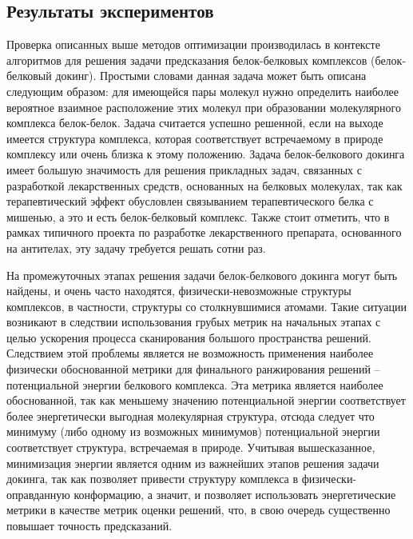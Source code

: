 \subsection{Результаты экспериментов}

  Проверка описанных выше методов оптимизации производилась в контексте алгоритмов для решения задачи предсказания белок-белковых комплексов (белок-белковый докинг). Простыми словами данная задача может быть описана следующим образом: для имеющейся пары молекул нужно определить наиболее вероятное взаимное расположение этих молекул при образовании молекулярного комплекса белок-белок. Задача считается успешно решенной, если на выходе имеется структура комплекса, которая соответствует встречаемому в природе комплексу или очень близка к этому положению. Задача белок-белкового докинга имеет большую значимость для решения прикладных задач, связанных с разработкой лекарственных средств, основанных на белковых молекулах, так как терапевтический эффект обусловлен связыванием терапевтического белка с мишенью, а это и есть белок-белковый комплекс. Также стоит отметить, что в рамках типичного проекта по разработке лекарственного препарата, основанного на антителах,
  эту задачу требуется решать сотни раз.

  На промежуточных этапах решения задачи белок-белкового докинга могут быть найдены, и очень часто находятся, физически-невозможные структуры комплексов, в частности, структуры со столкнувшимися атомами. Такие ситуации возникают в следствии использования грубых метрик на начальных этапах с целью ускорения процесса сканирования большого пространства решений. Следствием этой проблемы является не возможность применения наиболее физически обоснованной метрики для финального ранжирования решений -- потенциальной энергии белкового комплекса. Эта метрика является наиболее обоснованной, так как меньшему значению потенциальной энергии соответствует более энергетически выгодная молекулярная структура, отсюда следует что минимуму (либо одному из возможных минимумов) потенциальной энергии соответствует структура, встречаемая в природе. Учитывая вышесказанное, минимизация энергии является одним из важнейших этапов решения задачи докинга, так как позволяет привести структуру комплекса в физически-оправданную конформацию, а значит, и позволяет использовать энергетические метрики в качестве метрик оценки решений, что, в свою очередь существенно повышает точность предсказаний. 

